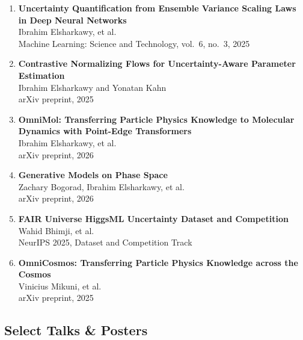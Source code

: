 \documentclass[11pt]{article}
\begin{document}
\begin{enumerate}
    \item \textbf{Uncertainty Quantification from Ensemble Variance Scaling Laws in Deep Neural Networks}\\
    Ibrahim Elsharkawy, et al.\\
    Machine Learning: Science and Technology, vol.\ 6, no.\ 3, 2025

    \item \textbf{Contrastive Normalizing Flows for Uncertainty-Aware Parameter Estimation}\\
    Ibrahim Elsharkawy and Yonatan Kahn\\
    arXiv preprint, 2025

    \item \textbf{OmniMol: Transferring Particle Physics Knowledge to Molecular Dynamics with Point-Edge Transformers}\\
    Ibrahim Elsharkawy, et al.\\
    arXiv preprint, 2026

    \item \textbf{Generative Models on Phase Space}\\
    Zachary Bogorad, Ibrahim Elsharkawy, et al.\\
    arXiv preprint, 2026

    \item \textbf{FAIR Universe HiggsML Uncertainty Dataset and Competition}\\
    Wahid Bhimji, et al.\\
    NeurIPS 2025, Dataset and Competition Track

    \item \textbf{OmniCosmos: Transferring Particle Physics Knowledge across the Cosmos}\\
    Vinicius Mikuni, et al.\\
    arXiv preprint, 2025
\end{enumerate}

\subsection{Select Talks \& Posters}
\label{sec:research-talks}
\end{document}
